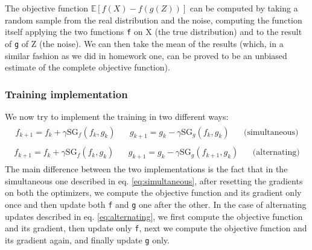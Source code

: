 \documentclass[12pt]{article}
\begin{document}
The objective function $\mathbb{E}[f(X) - f(g(Z))]$ can be computed by taking a random sample from the real distribution and the noise, computing the function itself applying the two functions \texttt{f} on X (the true distribution) and to the result of \texttt{g} of Z (the noise). We can then take the mean of the results (which, in a similar fashion as we did in homework one, can be proved to be an unbiased estimate of the complete objective function).

\subsubsection{Training implementation} \label{subsub:gan-train-impl}

We now try to implement the training in two different ways:
\begin{align}
\begin{aligned} \label{eq:simultaneous}
    f_{k+1} = f_{k} + \gamma \text{SG}_{f}(f_{k}, g_{k}) \ \ \ \  & g_{k+1} = g_{k} - \gamma \text{SG}_{g}(f_{k}, g_{k}) & \ \ \ \ \text{(simultaneous)}
\end{aligned}
\end{align}
\begin{align}
\begin{aligned} \label{eq:alternating}
    f_{k+1} = f_{k} + \gamma \text{SG}_{f}(f_{k}, g_{k}) \ \ \ \  & g_{k+1} = g_{k} - \gamma \text{SG}_{g}(f_{k+1}, g_{k}) & \ \ \ \ \text{(alternating)}
\end{aligned}
\end{align}
The main difference between the two implementations is the fact that in the simultaneous one described in eq. \eqref{eq:simultaneous}, after resetting the gradients on both the optimizers, we compute the objective function and its gradient only once and then update both \texttt{f} and \texttt{g} one after the other. In the case of alternating updates described in eq. \eqref{eq:alternating}, we first compute the objective function and its gradient, then update only \texttt{f}, next we compute the objective function and its gradient again, and finally update \texttt{g} only.
\end{document}
